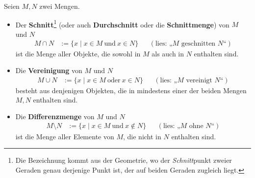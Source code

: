 \begin{defin}      \label{def:capcup}
    Seien $M,N$ zwei Mengen.
    \begin{itemize}
        \item Der \textbf{Schnitt}\footnote{Die Bezeichnung kommt aus der Geometrie, wo der \emph{Schnitt}punkt zweier Geraden genau derjenige Punkt ist, der auf beiden Geraden zugleich liegt.} (oder auch \textbf{Durchschnitt} oder die \textbf{Schnittmenge}) von $M$ und $N$
        \begin{align*}
            M \cap N & := \{x \mid x \in M\ \text{und}\ x \in N\} && (\text{lies: „$M$ geschnitten $N$“})
        \end{align*}
        ist die Menge aller Objekte, die sowohl in $M$ als auch in $N$ enthalten sind.
        \item Die \textbf{Vereinigung} von $M$ und $N$
        \begin{align*}
            M \cup N & := \{x \mid x \in M\ \text{oder}\ x \in N\} && (\text{lies: „$M$ vereinigt $N$“})
        \end{align*}
        besteht aus denjenigen Objekten, die in mindestens einer der beiden Mengen $M,N$ enthalten sind.
        \item Die \textbf{Differenzmenge} von $M$ und $N$
        \begin{align*}
            M \setminus N & := \{ x \mid x \in M \ \text{und}\ x \notin N \}  && (\text{lies: „$M$ ohne $N$“})
        \end{align*}
        ist die Menge aller Elemente von $M$, die nicht in $N$ enthalten sind.


\end{itemize}
\end{defin}
